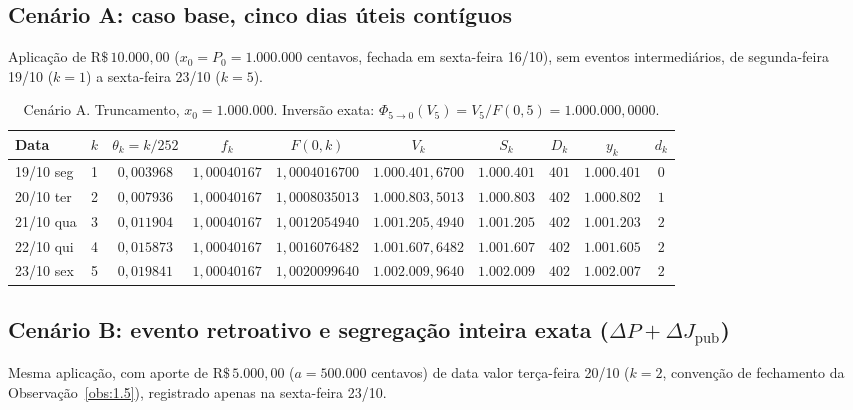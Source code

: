 \documentclass[11pt, a4paper]{article}
\theoremstyle{definition}
\theoremstyle{plain}
\theoremstyle{remark}
\begin{document}
\subsection{Cenário A: caso base, cinco dias úteis contíguos}\label{sec:7.1}

Aplicação de $\text{R\$}\,10.000{,}00$ ($x_0 = P_0 = 1.000.000$ centavos, fechada em sexta-feira 16/10), sem eventos intermediários, de segunda-feira 19/10 ($k=1$) a sexta-feira 23/10 ($k=5$).

\begin{table}[htbp]
\centering
\small
\begin{tabular}{@{}lcclcccccc@{}}
\toprule
\textbf{Data} & $k$ & $\theta_k = k/252$ & \multicolumn{1}{c}{$f_k$} & $F(0,k)$ & $V_k$ & $S_k$ & $D_k$ & $y_k$ & $d_k$ \\
\midrule
19/10 seg & 1 & $0{,}003968$ & $1{,}00040167$ & $1{,}0004016700$ & $1.000.401{,}6700$ & $1.000.401$ & $401$ & $1.000.401$ & $0$ \\
20/10 ter & 2 & $0{,}007936$ & $1{,}00040167$ & $1{,}0008035013$ & $1.000.803{,}5013$ & $1.000.803$ & $402$ & $1.000.802$ & $1$ \\
21/10 qua & 3 & $0{,}011904$ & $1{,}00040167$ & $1{,}0012054940$ & $1.001.205{,}4940$ & $1.001.205$ & $402$ & $1.001.203$ & $2$ \\
22/10 qui & 4 & $0{,}015873$ & $1{,}00040167$ & $1{,}0016076482$ & $1.001.607{,}6482$ & $1.001.607$ & $402$ & $1.001.605$ & $2$ \\
23/10 sex & 5 & $0{,}019841$ & $1{,}00040167$ & $1{,}0020099640$ & $1.002.009{,}9640$ & $1.002.009$ & $402$ & $1.002.007$ & $2$ \\
\bottomrule
\end{tabular}
\caption{Cenário A. Truncamento, $x_0 = 1.000.000$. Inversão exata: $\Phi_{5 \to 0}(V_5) = V_5 / F(0,5) = 1.000.000{,}0000$.}
\label{tab:6}
\end{table}

\subsection{Cenário B: evento retroativo e segregação inteira exata ($\Delta P + \Delta J_{\text{pub}}$)}\label{sec:7.2}

Mesma aplicação, com aporte de $\text{R\$}\,5.000{,}00$ ($a = 500.000$ centavos) de data valor terça-feira 20/10 ($k=2$, convenção de fechamento da Observação~\ref{obs:1.5}), registrado apenas na sexta-feira 23/10.
\end{document}
